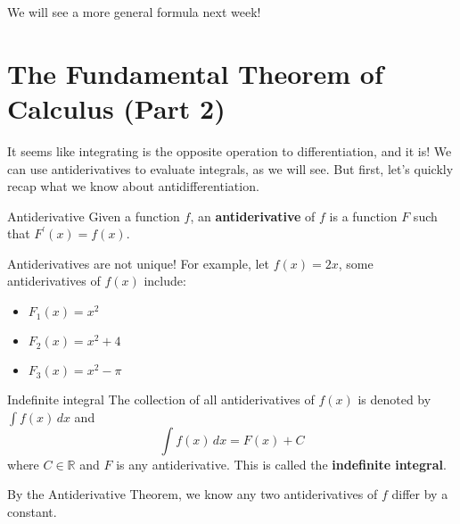 We will see a more general formula next week!

\section{The Fundamental Theorem of Calculus (Part 2)}
It seems like integrating is the opposite operation to
differentiation, and it is! We can use antiderivatives
to evaluate integrals, as we will see. But first, let's
quickly recap what we know about antidifferentiation.

\begin{Definition}{Antiderivative}{}
    Given a function $ f $, an \textbf{antiderivative} of
    $ f $ is a function $ F $ such that $ F^\prime(x)=f(x) $.
\end{Definition}

\begin{Remark}{}{}
    Antiderivatives are not unique! For example, let $ f(x)=2x $, some
    antiderivatives of $ f(x) $ include:
    \begin{itemize}
        \item $ F_1(x)=x^2 $
        \item $ F_2(x)=x^2+4 $
        \item $ F_3(x)=x^2-\pi $
    \end{itemize}
\end{Remark}

\begin{Definition}{Indefinite integral}{}
    The collection of all antiderivatives of $ f(x) $ is denoted
    by $ \displaystyle\int f(x)\, d{x} $ and
    \[ \int f(x)\, d{x} =F(x)+C \]
    where $ C\in\mathbb{R} $ and $ F $ is any antiderivative.
    This is called the \textbf{indefinite integral}.
\end{Definition}

\begin{Remark}{}{}
    By the Antiderivative Theorem, we know any two antiderivatives
    of $ f $ differ by a constant.
\end{Remark}

